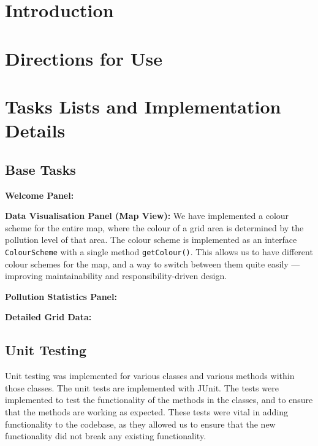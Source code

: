 \documentclass[10pt, a4paper]{scrartcl}
\begin{document}
    \begin{multicols}{2}


        \section{Introduction}
        

        \section{Directions for Use}

        \section{Tasks Lists and Implementation Details}

        \subsection{Base Tasks}

        \noindent \textbf{Welcome Panel:}

        \noindent \textbf{Data Visualisation Panel (Map View):} We have implemented a colour scheme for the entire map, where the colour
        of a grid area is determined by the pollution
        level of that area. The colour scheme is implemented as an interface \verb|ColourScheme| with a single method \verb|getColour()|.
        This allows us to have different colour schemes for the map, and a way to switch between them quite easily — improving 
        maintainability and responsibility-driven design.

        \noindent \textbf{Pollution Statistics Panel:}

        \noindent \textbf{Detailed Grid Data:}

        \subsection{Unit Testing}

        \noindent Unit testing was implemented for various classes and various methods within those classes. The unit tests are
        implemented with JUnit. The tests were implemented to test the functionality of the methods in the classes, and to ensure
        that the methods are working as expected. These tests were vital in adding functionality to the codebase, as they allowed
        us to ensure that the new functionality did not break any existing functionality.


\end{multicols}
\end{document}
